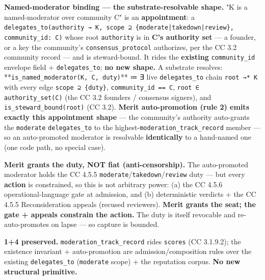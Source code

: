 \documentclass[11pt]{article}
\begin{document}
\textbf{Named-moderator binding — the substrate-resolvable shape.} "K is a named-moderator over community C" is an \textbf{appointment}: a \texttt{delegates\_to(authority → K, scope ⊇ \{moderate|takedown|review\}, community\_id: C)} whose root \texttt{authority} is in \textbf{C's authority set} — a founder, or a key the community's \texttt{consensus\_protocol} authorizes, per the CC 3.2 community record — and is steward-bound. It rides the \textbf{existing} \texttt{community\_id} envelope field + \texttt{delegates\_to}; \textbf{no new shape.} A substrate resolves: **\texttt{is\_named\_moderator(K, C, duty)}** ≔ ∃ live \texttt{delegates\_to} chain \texttt{root →* K} with every edge \texttt{scope ⊇ \{duty\}}, \texttt{community\_id == C}, \texttt{root ∈ authority\_set(C)} (the CC 3.2 founders / consensus signers), and \texttt{is\_steward\_bound(root)} (CC 3.2). \textbf{Merit auto-promotion (rule 2) emits exactly this appointment shape} — the community's authority auto-grants the \texttt{moderate} \texttt{delegates\_to} to the highest-\texttt{moderation\_track\_record} member — so an auto-promoted moderator is resolvable \textbf{identically} to a hand-named one (one code path, no special case).


\textbf{Merit grants the duty, NOT fiat (anti-censorship).} The auto-promoted moderator holds the CC 4.5.5 \texttt{moderate}/\texttt{takedown}/\texttt{review} duty — but every \textbf{action} is constrained, so this is not arbitrary power: (a) the CC 4.5.6 operational-language gate at admission, and (b) deterministic verdicts + the CC 4.5.5 Reconsideration appeals (recused reviewers). \textbf{Merit grants the seat; the gate + appeals constrain the action.} The duty is itself revocable and re-auto-promotes on lapse — so capture is bounded.


\textbf{1+4 preserved.} \texttt{moderation\_track\_record} rides \texttt{scores} (CC 3.1.9.2); the existence invariant + auto-promotion are admission/composition rules over the existing \texttt{delegates\_to} (\texttt{moderate} scope) + the reputation corpus. \textbf{No new structural primitive.}
\end{document}
